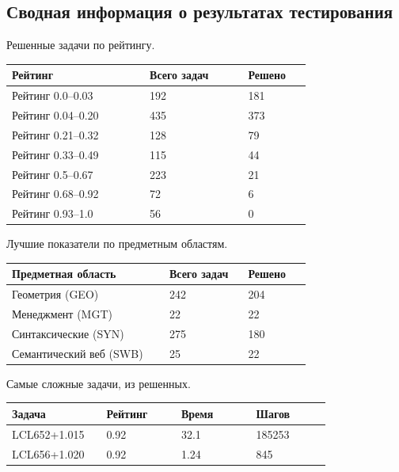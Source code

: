 \subsection{Сводная информация о результатах тестирования}

Решенные задачи по рейтингу.

\begin{longtable}[H]{|p{0.35\linewidth}|p{0.25\linewidth}|p{0.15\linewidth}|}
\hline
\textbf{Рейтинг} & \textbf{Всего задач} & \textbf{Решено} \\
\hline
Рейтинг 0.0--0.03 & 192 & 181 \\
\hline
Рейтинг 0.04--0.20 & 435 & 373 \\
\hline
Рейтинг 0.21--0.32 & 128 & 79 \\
\hline
Рейтинг 0.33--0.49 & 115 & 44 \\
\hline
Рейтинг 0.5--0.67 & 223 & 21 \\
\hline
Рейтинг 0.68--0.92 & 72 & 6 \\
\hline
Рейтинг 0.93--1.0 & 56 & 0\\
\hline
\end{longtable}


Лучшие показатели по предметным областям.

\begin{longtable}[H]{|p{0.4\linewidth}|p{0.2\linewidth}|p{0.15\linewidth}|}
\hline
\textbf{Предметная область} & \textbf{Всего задач} & \textbf{Решено} \\
\hline
Геометрия (GEO) & 242 & 204 \\
\hline
Менеджмент (MGT) & 22 & 22 \\
\hline
Синтаксические (SYN) & 275 & 180 \\
\hline
Семантический веб (SWB) & 25 & 22 \\
\hline
\end{longtable}


Самые сложные задачи, из решенных.

\begin{longtable}[H]{|p{0.2\linewidth}|p{0.2\linewidth}|p{0.2\linewidth}|p{0.2\linewidth}|}
\hline
\textbf{Задача} & \textbf{Рейтинг} & \textbf{Время} & \textbf{Шагов} \\
\hline
LCL652+1.015 & 0.92 & 32.1 & 185253 \\
\hline
LCL656+1.020 & 0.92 & 1.24 & 845 \\
\hline
\end{longtable}



